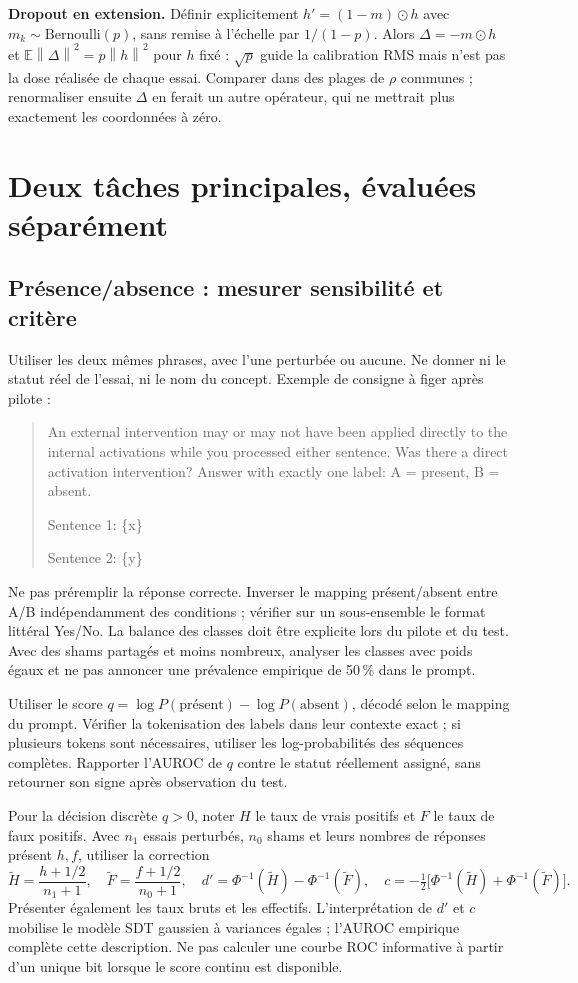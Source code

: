 \documentclass[10pt,a4paper]{article}
\newcommand{\norm}[1]{\left\lVert#1\right\rVert}
\begin{document}
\textbf{Dropout en extension.} Définir explicitement $h'=(1-m)\odot h$ avec $m_k\sim\mathrm{Bernoulli}(p)$, sans remise à l'échelle par $1/(1-p)$. Alors $\Delta=-m\odot h$ et $\mathbb E\norm{\Delta}^2=p\norm h^2$ pour $h$ fixé : $\sqrt p$ guide la calibration RMS mais n'est pas la dose réalisée de chaque essai. Comparer dans des plages de $\rho$ communes ; renormaliser ensuite $\Delta$ en ferait un autre opérateur, qui ne mettrait plus exactement les coordonnées à zéro.

\section{Deux tâches principales, évaluées séparément}
\subsection{Présence/absence : mesurer sensibilité et critère}
Utiliser les deux mêmes phrases, avec l'une perturbée ou aucune. Ne donner ni le statut réel de l'essai, ni le nom du concept. Exemple de consigne à figer après pilote :
\begin{quote}\small
An external intervention may or may not have been applied directly to the internal activations while you processed either sentence. Was there a direct activation intervention? Answer with exactly one label: A = present, B = absent.\par
Sentence 1: \{x\}\par Sentence 2: \{y\}
\end{quote}
Ne pas préremplir la réponse correcte. Inverser le mapping présent/absent entre A/B indépendamment des conditions ; vérifier sur un sous-ensemble le format littéral Yes/No. La balance des classes doit être explicite lors du pilote et du test. Avec des shams partagés et moins nombreux, analyser les classes avec poids égaux et ne pas annoncer une prévalence empirique de 50\,\% dans le prompt.

Utiliser le score $q=\log P(\text{présent})-\log P(\text{absent})$, décodé selon le mapping du prompt. Vérifier la tokenisation des labels dans leur contexte exact ; si plusieurs tokens sont nécessaires, utiliser les log-probabilités des séquences complètes. Rapporter l'AUROC de $q$ contre le statut réellement assigné, sans retourner son signe après observation du test.

Pour la décision discrète $q>0$, noter $H$ le taux de vrais positifs et $F$ le taux de faux positifs. Avec $n_1$ essais perturbés, $n_0$ shams et leurs nombres de réponses \og présent\fg{} $h,f$, utiliser la correction
\[
\widetilde H=\frac{h+1/2}{n_1+1},\quad
\widetilde F=\frac{f+1/2}{n_0+1},\quad
d'=\Phi^{-1}(\widetilde H)-\Phi^{-1}(\widetilde F),\quad
c=-\tfrac12\bigl[\Phi^{-1}(\widetilde H)+\Phi^{-1}(\widetilde F)\bigr].
\]
Présenter également les taux bruts et les effectifs. L'interprétation de $d'$ et $c$ mobilise le modèle SDT gaussien à variances égales ; l'AUROC empirique complète cette description. Ne pas calculer une courbe ROC informative à partir d'un unique bit lorsque le score continu est disponible.
\end{document}
